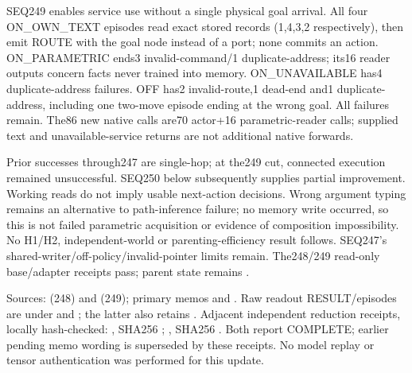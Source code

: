 \documentclass{article}
\begin{document}
SEQ249 enables service use without a single physical goal arrival. All four
ON\_OWN\_TEXT episodes read exact stored records (1,4,3,2 respectively), then
emit ROUTE with the goal node instead of a port; none commits an action.
ON\_PARAMETRIC ends3 invalid-command/1 duplicate-address; its16 reader outputs
concern facts never trained into memory. ON\_UNAVAILABLE has4 duplicate-address
failures. OFF has2 invalid-route,1 dead-end and1 duplicate-address, including
one two-move episode ending at the wrong goal. All failures remain.
The86 new native calls are70 actor+16 parametric-reader calls; supplied text
and unavailable-service returns are not additional native forwards.

Prior successes through247 are single-hop; at the249 cut, connected execution
remained unsuccessful. SEQ250 below subsequently supplies partial improvement.
Working reads do not imply usable next-action decisions. Wrong argument typing
remains an alternative to path-inference failure; no memory write occurred, so
this is not failed parametric acquisition or evidence of composition impossibility.
No H1/H2, independent-world or parenting-efficiency result follows. SEQ247's
shared-writer/off-policy/invalid-pointer limits remain. The248/249 read-only
base/adapter receipts pass;
parent state remains
.

Sources:  (248) and
 (249); primary memos
 and
.
Raw readout RESULT/episodes are under
and ;
the latter also retains .
Adjacent independent reduction receipts, locally hash-checked:
, SHA256
;
, SHA256
.
Both report COMPLETE; earlier pending memo wording is superseded by these
receipts. No model replay or tensor authentication was performed for this update.
\end{document}
